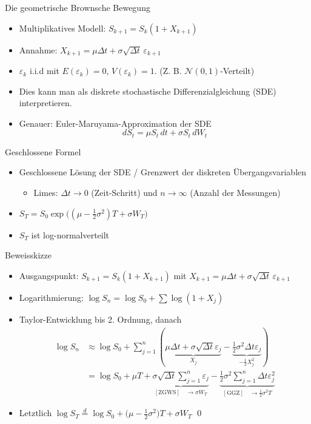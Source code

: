 \documentclass{beamer}
\begin{document}
\begin{frame}{Die geometrische Brownsche Bewegung}
  \begin{itemize}
      \item Multiplikatives Modell: $S_{k+1}=S_k(1+X_{k+1})$
      \item Annahme: $X_{k+1}=\mu\Delta t+\sigma\sqrt{\Delta t}\,\varepsilon_{k+1}$
      \item $\varepsilon_k$ i.i.d mit $E(\varepsilon_k)=0$, $V(\varepsilon_k)=1$. (Z. B. $\mathcal N(0,1)$-Verteilt)
      \item Dies kann man als diskrete stochastische Differenzialgleichung (SDE) interpretieren.
      \item Genauer: Euler-Maruyama-Approximation der SDE $$dS_t = \mu S_t\,dt + \sigma S_t\,dW_t$$
  \end{itemize}
\end{frame}

\begin{frame}{Geschlossene Formel}
  \begin{itemize}
      \item Geschlossene Lösung der SDE / Grenzwert der diskreten Übergangsvariablen
      \begin{itemize}
        \item Limes: $\Delta t \to 0$ (Zeit-Schritt) und $n \to \infty$ (Anzahl der Messungen)
      \end{itemize}
      \item $S_T = S_0 \exp\big((\mu-\tfrac12\sigma^2)T + \sigma W_T\big)$
      \item $S_T$ ist log-normalverteilt
  \end{itemize}
\end{frame}

\begin{frame}{Beweisskizze}
  \begin{itemize}
      \item Ausgangspunkt: $S_{k+1}=S_k(1+X_{k+1})$ mit $X_{k+1}=\mu\Delta t+\sigma\sqrt{\Delta t}\,\varepsilon_{k+1}$
      \item Logarithmierung: $\log S_n = \log S_0 + \sum \log(1+X_j)$
      \item Taylor-Entwicklung bis 2. Ordnung, danach $$
\begin{aligned}
\log S_n &\approx \log S_0 + \sum_{j=1}^n\left( \underbrace{\mu \Delta t + \sigma\sqrt{\Delta t} \varepsilon_j}_{X_j} - \underbrace{\frac{1}{2} \sigma^2 \Delta t \varepsilon_j}_{-\frac{1}{2} X_j^2} \right)
\\ &= \log S_0 + \mu T +  \underbrace{\sigma\sqrt{\Delta t} \sum_{j=1}^{n} \varepsilon_j}_{\mathrm{[ZGWS]} \quad \to \sigma W_T} - \underbrace{\frac{1}{2} \sigma^2 \sum_{j=1}^{n} \Delta t \varepsilon_j^2}_{\mathrm{[GGZ]} \quad \to \frac12 \sigma^2 T}
\end{aligned}
$$
      \item Letztlich $\log S_T \overset{d} = \log S_0 + \big(\mu - \tfrac12 \sigma^2\big)T + \sigma W_T$ \qed
  \end{itemize}
\end{frame}
\end{document}

